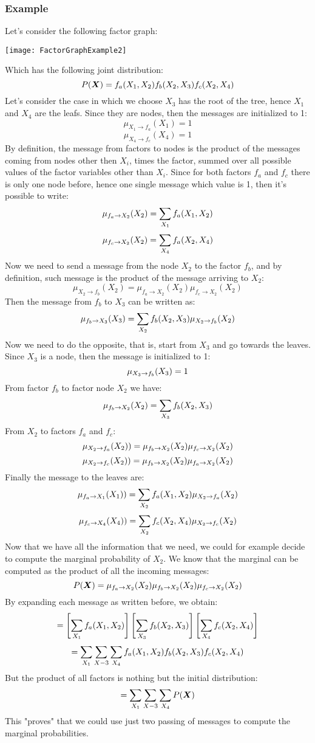\subsubsection{Example}
Let's consider the following factor graph: 
\begin{center}
  \texttt{[image: FactorGraphExample2]}
\end{center}
Which has the following joint distribution: 
\[P(\bm{X})=f_a(X_1,X_2)f_b(X_2,X_3)f_c(X_2,X_4)\]
Let's consider the case in which we choose $X_3$ has the root of the tree, hence $X_1$ and $X_4$ are the leafs. Since they are nodes, then the messages are initialized to 1:
\[\mu_{X_1\rightarrow f_a}(X_1)=1\]
\[\mu_{X_4\rightarrow f_c}(X_4)=1\]
By definition, the message from factors to nodes is the product of the messages coming from nodes other then $X_i$, times the factor, summed over all possible values of the factor variables other than $X_i$. Since for both factors $f_a$ and $f_c$ there is only one node before, hence one single message which value is 1, then it's possible to write:
\[\mu_{f_a\rightarrow X_2}(X_2)=\displaystyle\sum_{X_1}f_a(X_1,X_2)\]
\[\mu_{f_c\rightarrow X_2}(X_2)=\displaystyle\sum_{X_4}f_a(X_2,X_4)\]
Now we need to send a message from the node $X_2$ to the factor $f_b$, and by definition, such message is the product of the message arriving to $X_2$:
\[\mu_{X_2\rightarrow f_b}(X_2)=\mu_{f_a\rightarrow X_2}(X_2)\mu_{f_c\rightarrow X_2}(X_2)\]
Then the message from $f_b$ to $X_3$ can be written as:
\[\mu_{f_b\rightarrow X_3}(X_3)=\displaystyle\sum_{X_2}f_b(X_2,X_3)\mu_{X_2\rightarrow f_b}(X_2)\]
Now we need to do the opposite, that is, start from $X_3$ and go towards the leaves. Since $X_3$ is a node, then the message is initialized to 1:
\[\mu_{X_3\rightarrow f_b}(X_3)=1\]
From factor $f_b$ to factor node $X_2$ we have:
\[\mu_{f_b\rightarrow X_2}(X_2)=\displaystyle\sum_{X_3}f_b(X_2, X_3)\]
From $X_2$ to factors $f_a$ and $f_c$:
\[\mu_{X_2\rightarrow f_a}(X_2))=\mu_{f_b\rightarrow X_2}(X_2)\mu_{f_c\rightarrow X_2}(X_2)\]
\[\mu_{X_2\rightarrow f_c}(X_2))=\mu_{f_b\rightarrow X_2}(X_2)\mu_{f_a\rightarrow X_2}(X_2)\]
Finally the message to the leaves are:
\[\mu_{f_a\rightarrow X_1}(X_1))=\displaystyle\sum_{X_2}f_a(X_1, X_2)\mu_{X_2\rightarrow f_a}(X_2)\]
\[\mu_{f_c\rightarrow X_4}(X_4))=\displaystyle\sum_{X_2}f_c(X_2, X_4)\mu_{X_2\rightarrow f_c}(X_2)\]
Now that we have all the information that we need, we could for example decide to compute the marginal probability of $X_2$. We know that the marginal can be computed as the product of all the incoming messages:
\[P(\bm{X})=\mu_{f_a\rightarrow X_2}(X_2)\mu_{f_b\rightarrow X_2}(X_2)\mu_{f_c\rightarrow X_2}(X_2)\]
By expanding each message as written before, we obtain:
\[=\left[\displaystyle\sum_{X_1}f_a(X_1, X_2)\right]\left[\displaystyle\sum_{X_3}f_b(X_2, X_3)\right]\left[\displaystyle\sum_{X_4}f_c(X_2, X_4)\right]\]
\[=\displaystyle\sum_{X_1}\displaystyle\sum_{X-3}\displaystyle\sum_{X_4}f_a(X_1,X_2)f_b(X_2,X_3)f_c(X_2,X_4)\]
But the product of all factors is nothing but the initial distribution:
\[=\displaystyle\sum_{X_1}\displaystyle\sum_{X-3}\displaystyle\sum_{X_4}P(\bm{X})\]
This "proves" that we could use just two passing of messages to compute the marginal probabilities. \newline
%
